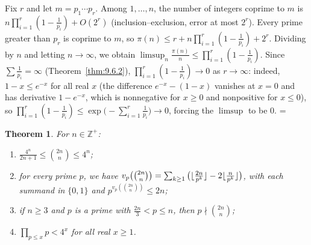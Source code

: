 \documentclass[11pt]{article}
\makeatletter
\theoremstyle{ntstyle}
\newtheorem{theorem}{Theorem}[subsection]
\let\nt@closedisplay\]
\def\nt@guardedclose{\@ifnextchar\par{\nt@closeafterpar}{\@ifnextchar\end{\postdisplaypenalty\@M\nt@closedisplay}{\nt@closedisplay}}}
\def\nt@closeafterpar\par{\@ifnextchar\par{\nt@closeafterpar}{\@ifnextchar\end{\postdisplaypenalty\@M\nt@closedisplay\par}{\nt@closedisplay\par}}}
\renewenvironment{proof}[1][\proofname]{\par
  \pushQED{\qed}\normalfont\topsep\medskipamount\edef\nt@afterproof{\@endparpenalty=\the\@endparpenalty\relax}\@beginparpenalty\@M\@endparpenalty\@M\let\]\nt@guardedclose\trivlist\item[]\textit{#1\@addpunct{.}} \ignorespaces}{\ifvmode\addpenalty\@M\fi\popQED\nt@afterproof\endtrivlist\@endpefalse}
\makeatother
\begin{document}
\begin{proof} Fix $r$ and let $m = p_1\cdots p_r$. Among
	$1,\ldots,n$, the number of integers coprime to $m$ is
	$n\prod_{i=1}^r(1-\tfrac{1}{p_i}) + O(2^r)$ (inclusion--exclusion,
	error at most $2^r$). Every prime greater than $p_r$ is coprime to $m$, so
	$\pi(n) \le r + n\prod_{i=1}^r(1-\tfrac{1}{p_i}) + 2^r$. Dividing by
	$n$ and letting $n\to\infty$, we obtain $\limsup_n \tfrac{\pi(n)}{n} \le
		\prod_{i=1}^r(1-\tfrac{1}{p_i})$. Since $\sum\tfrac{1}{p_i}=\infty$
	(Theorem~\ref{thm:9.6.2}), $\prod_{i=1}^r(1-\tfrac{1}{p_i})\to 0$ as
	$r\to\infty$: indeed, $1-x\le e^{-x}$ for all real $x$ (the difference
	$e^{-x}-(1-x)$ vanishes at $x=0$ and has derivative $1-e^{-x}$, which is
	nonnegative for $x\ge0$ and nonpositive for $x\le0$), so
	$\prod_{i=1}^{r}(1-\tfrac{1}{p_i})\le\exp\big(-\sum_{i=1}^{r}\tfrac{1}{p_i}\big)\to0$,
	forcing the $\limsup$ to be $0$.
\end{proof}
\begin{theorem}\label{thm:9.6.4} For $n\in\mathbb{Z}^+$:
	\begin{enumerate}[label={\alph*)}]
		\item $\tfrac{4^n}{2n+1}\le\binom{2n}{n}\le 4^n$;
		\item for every prime $p$,
					we have $v_p\bigl(\tbinom{2n}{n}\bigr)=\sum_{k\ge1}\big(\lfloor\tfrac{2n}{p^k}\rfloor-2\lfloor\tfrac{n}{p^k}\rfloor\big)$,
					with each summand in $\{0,1\}$ and
					$p^{v_p\left(\binom{2n}{n}\right)}\le 2n$;
		\item if $n\ge3$ and $p$ is a prime with $\tfrac{2n}{3}<p\le n$, then
					$p\nmid\binom{2n}{n}$;
		\item $\prod_{p\le x}p<4^{x}$ for all real $x\ge1$.
	\end{enumerate}
\end{theorem}
\end{document}
